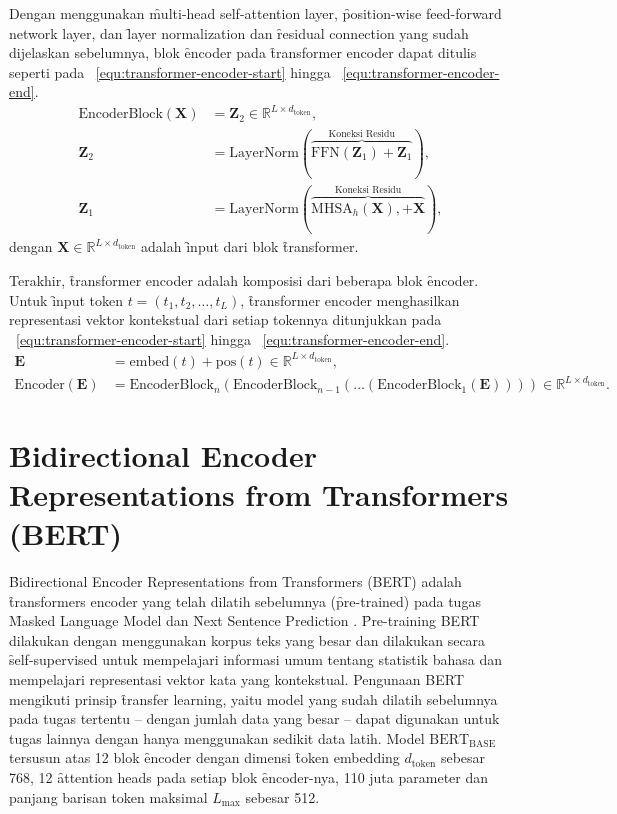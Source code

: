 	Dengan menggunakan \f{multi-head self-attention layer}, \f{position-wise feed-forward network layer}, dan \f{layer normalization} dan \f{residual connection} yang sudah dijelaskan sebelumnya, blok \f{encoder} pada \f{transformer encoder} dapat ditulis seperti pada \equ~\ref{equ:transformer-encoder-start} hingga \equ~\ref{equ:transformer-encoder-end}.
	\begin{align}
	\text{EncoderBlock}(\mathbf{X}) &= \mathbf{Z}_2 \in \mathbb{R}^{L \times d_{\text{token}}}, \\
	\mathbf{Z}_2 &= \text{LayerNorm}(\overbrace{\text{FFN}(\mathbf{Z}_1)+\mathbf{Z}_1}^{\text{Koneksi Residu}}), \\
	\mathbf{Z}_1 &= \text{LayerNorm}(\overbrace{\text{MHSA}_h(\mathbf{X}), + \mathbf{X}}^{\text{Koneksi Residu}}),
	\end{align}
	dengan $\mathbf{X} \in \mathbb{R}^{L \times d_{\text{token}}}$ adalah \f{input} dari blok \f{transformer}.

	Terakhir, \f{transformer encoder} adalah komposisi dari beberapa blok \f{encoder}. Untuk \f{input} token $t=(t_1, t_2, \dots, t_L)$, \f{transformer encoder} menghasilkan representasi vektor kontekstual dari setiap tokennya ditunjukkan pada \equ~\ref{equ:transformer-encoder-start} hingga \equ~\ref{equ:transformer-encoder-end}.
	\begin{align}
		\label{equ:transformer-encoder-start} 
		\mathbf{E} &= \text{embed}(t)+ \text{pos}(t) \in \mathbb{R}^{L \times d_{\text{token}}}, \\
		\label{equ:transformer-encoder-end}
		\text{Encoder}(\mathbf{E}) &= \text{EncoderBlock}_n(\text{EncoderBlock}_{n-1}(\dots(\text{EncoderBlock}_1(\mathbf{E})))) \in \mathbb{R}^{L \times d_{\text{token}}}.
	\end{align}


\section{\f{Bidirectional Encoder Representations from Transformers} (BERT)}
\f{Bidirectional Encoder Representations from Transformers} (BERT) adalah \f{transformers encoder} yang telah dilatih sebelumnya (\f{pre-trained}) pada tugas \f{Masked Language Model} dan \f{Next Sentence Prediction} \citep{bertori}. \f{Pre-training} BERT dilakukan dengan menggunakan korpus teks yang besar dan dilakukan secara \f{self-supervised} untuk mempelajari informasi umum tentang statistik bahasa dan mempelajari representasi vektor kata yang kontekstual. Pengunaan BERT mengikuti prinsip \f{transfer learning}, yaitu model yang sudah dilatih sebelumnya pada tugas tertentu -- dengan jumlah data yang besar -- dapat digunakan untuk tugas lainnya dengan hanya menggunakan sedikit data latih. Model $\text{BERT}_{\text{BASE}}$ tersusun atas 12 blok \f{encoder} dengan dimensi \f{token embedding} $d_{\text{token}}$ sebesar 768, 12 \f{attention heads} pada setiap blok \f{encoder}-nya, 110 juta parameter dan panjang barisan token maksimal $L_{\max}$ sebesar 512.

